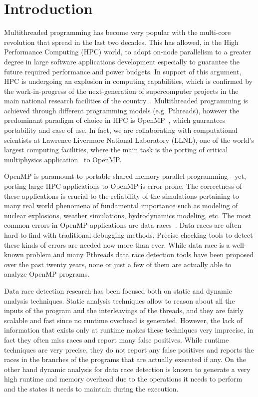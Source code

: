 \section{Introduction}
\label{sec:introduction}

Multithreaded programming has become very popular with the multi-core
revolution that spread in the last two decades.
%
This has allowed, in the High Performance Computing (HPC) world, to adopt
on-node parallelism to a greater degree in large software applications
development especially to guarantee the future required performance and power
budgets.
%
In support of this argument, HPC is undergoing an explosion in
computing capabilities, which is confirmed by the work-in-progress of the
next-generation of supercomputer projects in the main national research
facilities of the country~\cite{sierra, summit, trinity}.
%
Multithreaded programming is achieved through different programming models
(e.g. Pthreads), however the predominant paradigm of choice in HPC is
OpenMP~\cite{ompdoc}, which guarantees portability and ease of use.
%
In fact, we are collaborating with computational scientists at Lawrence
Livermore National Laboratory (LLNL), one of the world's largest computing
facilities, where the main task is the porting of critical multiphysics
application~\cite{llnl-apps} to OpenMP.

OpenMP is paramount to portable shared memory parallel programming - yet,
porting large HPC applications to OpenMP is error-prone.
%
The correctness of these applications is crucial to the reliability of the
simulations pertaining to many real world phenomena of fundamental importance
such as modeling of nuclear explosions, weather simulations, hydrodynamics
modeling, etc.
%
The most common errors in OpenMP applications are data
races~\cite{sus_common_2008}.
%
Data races are often hard to find with traditional debugging methods.
%
Precise checking tools to detect these kinds of errors are needed now more
than ever.
%
While data race is a well-known problem and many Pthreads data race detection
tools have been proposed over the past twenty years, none or just a few of
them are actually able to analyze OpenMP programs.

Data race detection research has been focused both on static and dynamic
analysis techniques.
%                                                 
Static analysis techniques allow to reason about all the inputs of the program
and the interleavings of the threads, and they are fairly scalable and fast
since no runtime overhead is generated.
%
However, the lack of information that exists only at runtime makes these
techniques very imprecise, in fact they often miss races and report many false
positives.
%
While runtime techniques are very precise, they do not report any false
positives and reports the races in the branches of the programs that are
actually executed if any.
%
On the other hand dynamic analysis for data race detection is known to
generate a very high runtime and memory overhead due to the operations it
needs to perform and the states it needs to maintain during the execution.

